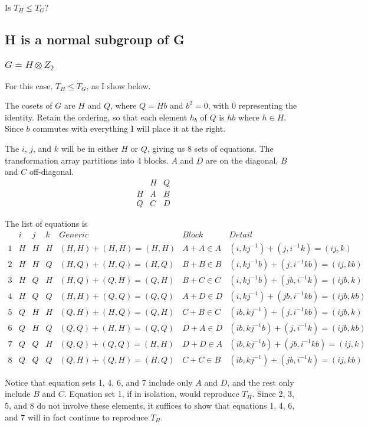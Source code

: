 \documentclass{revtex4-1}
\begin{document}
\par Is $T_H \leq T_G$?

\subsection{H is a normal subgroup of G}

\subsubsection{$G = H \otimes Z_2$}

For this case, $T_H \leq T_G$, as I show below.

\par The cosets of $G$ are $H$ and $Q$, where $Q=Hb$ and $b^2 =0$, with $0$ representing the identity.
Retain the ordering, so that each element $h_b$ of $Q$ is $h b$ where $h \in H$.  Since $b$ commutes
with everything I will place it at the right.

\par The $i$, $j$, and $k$ will be in either $H$ or $Q$, giving us 8 sets of equations.  The transformation
array partitions into 4 blocks.  $A$ and $D$ are on the diagonal, $B$ and $C$ off-diagonal.
$$
\begin{array}{ccc}
 & H & Q \\
H & A & B \\
Q & C & D
\end{array}
$$

\par The list of equations is
$$
\begin{array}{ccccccc}
  & i & j & k & Generic & Block & Detail \\
1 & H & H & H & (H,H)+(H,H)=(H,H) & A+A \in A & (i,kj^{-1}) + (j,i^{-1}k)=(ij,k) \\
2 & H & H & Q & (H,Q)+(H,Q)=(H,Q) & B+B \in B & (i,kj^{-1}b) + (j,i^{-1}kb)=(ij,kb) \\
3 & H & Q & H & (H,Q)+(Q,H)=(Q,H) & B+C \in C & (i,kj^{-1}b) + (jb,i^{-1}k)=(ijb,k) \\
4 & H & Q & Q & (H,H)+(Q,Q)=(Q,Q) & A+D \in D & (i,kj^{-1}) + (jb,i^{-1}kb)=(ijb,kb) \\
5 & Q & H & H & (Q,H)+(H,Q)=(Q,H) & C+B \in C & (ib,kj^{-1}) + (j,i^{-1}kb)=(ijb,k) \\
6 & Q & H & Q & (Q,Q)+(H,H)=(Q,Q) & D+A \in D & (ib,kj^{-1}b) + (j,i^{-1}k)=(ijb,kb) \\
7 & Q & Q & H & (Q,Q)+(Q,Q)=(H,H) & D+D \in A & (ib,kj^{-1}b) + (jb,i^{-1}kb)=(ij,k) \\
8 & Q & Q & Q & (Q,H)+(Q,H)=(H,Q) & C+C \in B & (ib,kj^{-1}) + (jb,i^{-1}k)=(ij,kb) 
\end{array}
$$
\par Notice that equation sets 1, 4, 6, and 7 include only $A$ and $D$, and the rest only include
$B$ and $C$.  Equation set 1, if in isolation, would reproduce $T_H$.  Since 2, 3, 5, and 8
do not involve these elements, it suffices to show that equations 1, 4, 6, and 7 will in fact
continue to reproduce $T_H$.
\end{document}
